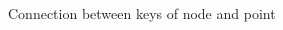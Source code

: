 \begin{frame}
    \begin{figure}
        \centering
        \begin{animateinline}[controls={step,play,stop},buttonsize=10pt]{.5}
        \end{animateinline}
        \caption{Connection between keys of node and point}
    \end{figure}
\end{frame}

